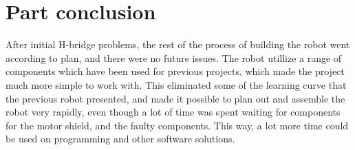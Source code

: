 \section{Part conclusion}
After initial H-bridge problems, the rest of the process of building the robot went according to plan, and there were no future issues. The robot utillize a range of components which have been used for previous projects, which made the project much more simple to work with. This eliminated some of the learning curve that the previous robot presented, and made it possible to plan out and assemble the robot very rapidly, even though a lot of time was spent waiting for components for the motor shield, and the faulty components. This way, a lot more time could be used on programming and other software solutions. 
